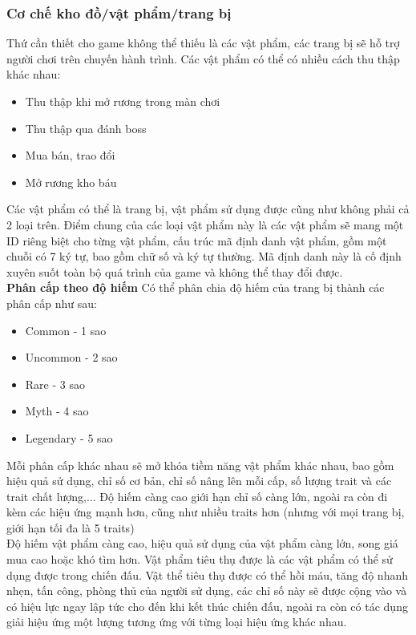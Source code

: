 \subsubsection{Cơ chế kho đồ/vật phẩm/trang bị}
\hspace*{0.5cm} Thứ cần thiết cho game không thể thiếu là các vật phẩm, các trang bị sẽ hỗ trợ người chơi trên chuyến hành trình. Các vật phẩm có thể có nhiều cách thu thập khác nhau:
\begin{itemize}
	\item Thu thập khi mở rương trong màn chơi
	\item Thu thập qua đánh boss
	\item Mua bán, trao đổi
	\item Mở rương kho báu
\end{itemize}

\hspace*{0.5cm} Các vật phẩm có thể là trang bị, vật phẩm sử dụng được cũng như không phải cả 2 loại trên. Điểm chung của các loại vật phẩm này là các vật phẩm sẽ mang một ID riêng biệt cho từng vật phẩm, cấu trúc mã định danh vật phẩm, gồm một chuỗi có 7 ký tự, bao gồm chữ số và ký tự thường. Mã định danh này là cố định xuyên suốt toàn bộ quá trình của game và không thể thay đổi được.\\

\textbf{Phân cấp theo độ hiếm}
\hspace*{0.5cm} Có thể phân chia độ hiếm của trang bị thành các phân cấp như sau:
\begin{itemize}
	\item Common - 1 sao
	\item Uncommon - 2 sao
	\item Rare - 3 sao
	\item Myth - 4 sao
	\item Legendary - 5 sao
\end{itemize}

\hspace*{0.5cm} Mỗi phân cấp khác nhau sẽ mở khóa tiềm năng vật phẩm khác nhau, bao gồm hiệu quả sử dụng, chỉ số cơ bản, chỉ số nâng lên mỗi cấp, số lượng trait và các trait chất lượng,... Độ hiếm càng cao giới hạn chỉ số càng lớn, ngoài ra còn đi kèm các hiệu ứng mạnh hơn, cũng như nhiều traits hơn (nhưng với mọi trang bị, giới hạn tối đa là 5 traits)\\

\hspace*{0.5cm} Độ hiếm vật phẩm càng cao, hiệu quả sử dụng của vật phẩm càng lớn, song giá mua cao hoặc khó tìm hơn. 
\hspace*{0.5cm} Vật phẩm tiêu thụ được là các vật phẩm có thể sử dụng được trong chiến đấu. Vật thể tiêu thụ được có thể hồi máu, tăng độ nhanh nhẹn, tấn công, phòng thủ của người sử dụng, các chỉ số này sẽ được cộng vào và có hiệu lực ngay lập tức cho đến khi kết thúc chiến đấu, ngoài ra còn có tác dụng giải hiệu ứng một lượng tương ứng với từng loại hiệu ứng khác nhau.\\


